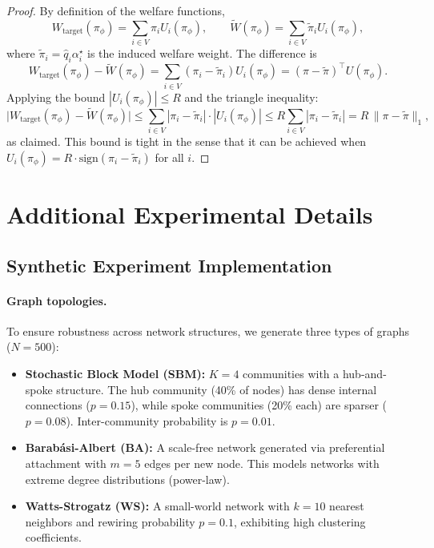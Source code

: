 \documentclass{article}
\theoremstyle{plain}
\theoremstyle{definition}
\theoremstyle{remark}
\begin{document}
\begin{proof}
By definition of the welfare functions,
\begin{equation}
    W_{\text{target}}(\pi_\phi) = \sum_{i \in V} \pi_i U_i(\pi_\phi),
    \qquad
    \widetilde{W}(\pi_\phi) = \sum_{i \in V} \tilde\pi_i U_i(\pi_\phi),
\end{equation}
where $\tilde\pi_i = \hat q_i \alpha_i^\star$ is the induced welfare weight.
The difference is
\begin{equation}
    W_{\text{target}}(\pi_\phi) - \widetilde{W}(\pi_\phi)
    =
    \sum_{i \in V} (\pi_i - \tilde\pi_i) U_i(\pi_\phi)
    =
    (\pi - \tilde\pi)^\top U(\pi_\phi).
\end{equation}
Applying the bound $|U_i(\pi_\phi)| \le R$ and the triangle inequality:
\begin{equation}
    \big|
        W_{\text{target}}(\pi_\phi) - \widetilde{W}(\pi_\phi)
    \big|
    \le
    \sum_{i \in V} |\pi_i - \tilde\pi_i| \cdot |U_i(\pi_\phi)|
    \le
    R \sum_{i \in V} |\pi_i - \tilde\pi_i|
    =
    R \, \|\pi - \tilde\pi\|_1,
\end{equation}
as claimed. This bound is tight in the sense that it can be achieved when
$U_i(\pi_\phi) = R \cdot \text{sign}(\pi_i - \tilde\pi_i)$ for all $i$.
\end{proof}

\section{Additional Experimental Details}
\label{app:exp-details}

\subsection{Synthetic Experiment Implementation}
\label{app:synthetic-impl}

\paragraph{Graph topologies.}
To ensure robustness across network structures, we generate three types of graphs ($N=500$):
\begin{itemize}
    \item \textbf{Stochastic Block Model (SBM):} $K=4$ communities with a hub-and-spoke structure. The hub community (40\% of nodes) has dense internal connections ($p=0.15$), while spoke communities (20\% each) are sparser ($p=0.08$). Inter-community probability is $p=0.01$.
    \item \textbf{Barabási-Albert (BA):} A scale-free network generated via preferential attachment with $m=5$ edges per new node. This models networks with extreme degree distributions (power-law).
    \item \textbf{Watts-Strogatz (WS):} A small-world network with $k=10$ nearest neighbors and rewiring probability $p=0.1$, exhibiting high clustering coefficients.
\end{itemize}
\end{document}
